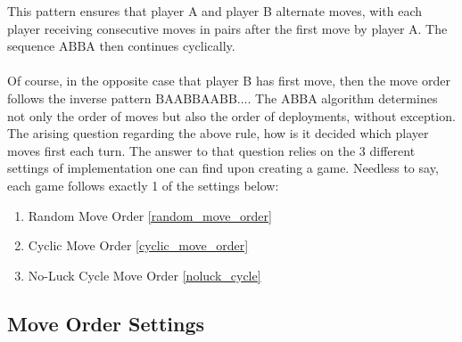 This pattern ensures that player A and player B alternate moves, with each player receiving consecutive moves in pairs after the first move by player A. The sequence $\text{ABBA}$ then continues cyclically.
\\
\\
Of course, in the opposite case that player B has first move, then the move order follows the inverse pattern $\text{BAABBAABB} \dots$. The ABBA algorithm determines not only the order of moves but also the order of deployments, without exception. The arising question regarding the above rule, how is it decided which player moves first each turn. The answer to that question relies on the 3 different settings of implementation one can find upon creating a game. Needless to say, each game follows exactly 1 of the settings below:
\begin{enumerate}
    \item Random Move Order \ref{random_move_order}
    \item Cyclic Move Order \ref{cyclic_move_order}
    \item No-Luck Cycle Move Order \ref{noluck_cycle}
\end{enumerate}



\subsection{Move Order Settings}

